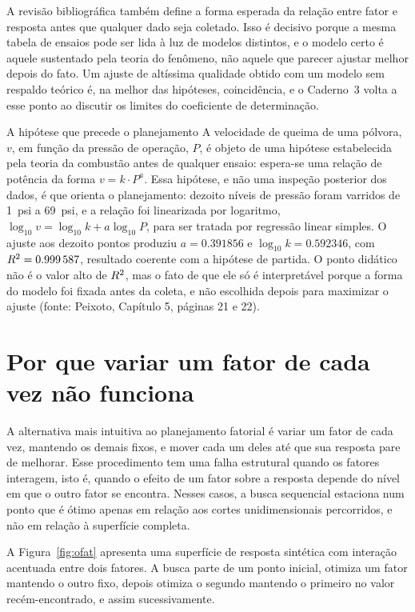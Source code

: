 \documentclass{doeapostila}
\begin{document}
A revisão bibliográfica também define a forma esperada da relação entre
fator e resposta antes que qualquer dado seja coletado. Isso é decisivo
porque a mesma tabela de ensaios pode ser lida à luz de modelos distintos, e
o modelo certo é aquele sustentado pela teoria do fenômeno, não aquele que
parecer ajustar melhor depois do fato. Um ajuste de altíssima qualidade
obtido com um modelo sem respaldo teórico é, na melhor das hipóteses,
coincidência, e o Caderno~3 volta a esse ponto ao discutir os limites do
coeficiente de determinação.

\begin{aplicacao}{A hipótese que precede o planejamento}
  A velocidade de queima de uma pólvora, $v$, em função da pressão de
  operação, $P$, é objeto de uma hipótese estabelecida pela teoria da
  combustão antes de qualquer ensaio: espera-se uma relação de potência da
  forma $v = k \cdot P^{a}$. Essa hipótese, e não uma inspeção posterior dos
  dados, é que orienta o planejamento: dezoito níveis de pressão foram
  varridos de \qty{1}{psi} a \qty{69}{psi}, e a relação foi linearizada por
  logaritmo, $\log_{10} v = \log_{10} k + a \log_{10} P$, para ser tratada
  por regressão linear simples. O ajuste aos dezoito pontos produziu
  $a = \num{0.391856}$ e $\log_{10} k = \num{0.592346}$, com
  $R^{2} = \num{0.999587}$, resultado coerente com a hipótese de partida.
  O ponto didático não é o valor alto de $R^{2}$, mas o fato de que ele só
  é interpretável porque a forma do modelo foi fixada antes da coleta, e não
  escolhida depois para maximizar o ajuste (fonte: Peixoto, Capítulo 5,
  páginas 21 e 22).
\end{aplicacao}

\section{Por que variar um fator de cada vez não funciona}
\label{sec:ofat}

A alternativa mais intuitiva ao planejamento fatorial é variar um fator de
cada vez, mantendo os demais fixos, e mover cada um deles até que sua
resposta pare de melhorar. Esse procedimento tem uma falha estrutural
quando os fatores interagem, isto é, quando o efeito de um fator sobre a
resposta depende do nível em que o outro fator se encontra. Nesses casos, a
busca sequencial estaciona num ponto que é ótimo apenas em relação aos
cortes unidimensionais percorridos, e não em relação à superfície completa.

A Figura~\ref{fig:ofat} apresenta uma superfície de resposta sintética com
interação acentuada entre dois fatores. A busca parte de um ponto inicial,
otimiza um fator mantendo o outro fixo, depois otimiza o segundo mantendo o
primeiro no valor recém-encontrado, e assim sucessivamente.
\end{document}
